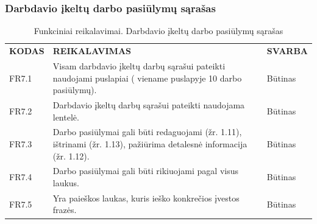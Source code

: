 \documentclass{VUMIFPSkursinis}
\begin{document}
\subsubsection{Darbdavio įkeltų darbo pasiūlymų sąrašas}
\begin{table}[H]
\caption{Funkciniai reikalavimai. Darbdavio įkeltų darbo pasiūlymų sąrašas}
\centering
\normalsize
\begin{tabular}{|p{2cm}|p{10cm}|p{3cm}|}
\hline
\rowcolor{gray!30}
\multicolumn{3}{|l|}{\textbf{7. Darbdavio įkeltų darbo pasiūlymų sąrašas}} \\ \hline
\textbf{KODAS}& \multicolumn{1}{m{10cm}|}{\textbf{REIKALAVIMAS}} & \textbf{SVARBA} \\ \hline
FR7.1 & \multicolumn{1}{m{10cm}|}{Visam darbdavio įkeltų darbų sąrašui pateikti naudojami puslapiai ( viename puslapyje 10 darbo pasiūlymų).} & Būtinas \\ \hline
FR7.2 & \multicolumn{1}{m{10cm}|}{Darbdavio įkeltų darbų sąrašui pateikti naudojama lentelė.} & Būtinas \\ \hline
FR7.3 & \multicolumn{1}{m{10cm}|}{Darbo pasiūlymai gali būti redaguojami (žr. 1.11), ištrinami (žr. 1.13), pažiūrima detalesnė informacija (žr. 1.12).} & Būtinas \\ \hline
FR7.4 & \multicolumn{1}{m{10cm}|}{Darbo pasiūlymai gali būti rikiuojami pagal visus laukus.} & Būtinas \\ \hline
FR7.5 & \multicolumn{1}{m{10cm}|}{Yra paieškos laukas, kuris ieško konkrečios įvestos frazės.} & Būtinas \\ \hline
\end{tabular}
\end{table}
\end{document}
